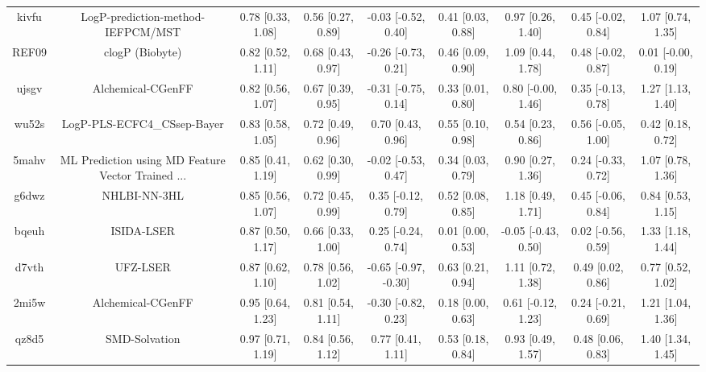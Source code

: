 \documentclass{article}
\begin{document}
\begin{center}
\begin{longtable}{|ccccccccc|}
 kivfu &                  LogP-prediction-method-IEFPCM/MST &  0.78 [0.33, 1.08] &  0.56 [0.27, 0.89] &   -0.03 [-0.52, 0.40] &  0.41 [0.03, 0.88] &    0.97 [0.26, 1.40] &   0.45 [-0.02, 0.84] &     1.07 [0.74, 1.35] \\
 REF09 &                                    clogP (Biobyte) &  0.82 [0.52, 1.11] &  0.68 [0.43, 0.97] &   -0.26 [-0.73, 0.21] &  0.46 [0.09, 0.90] &    1.09 [0.44, 1.78] &   0.48 [-0.02, 0.87] &    0.01 [-0.00, 0.19] \\
 ujsgv &                                  Alchemical-CGenFF &  0.82 [0.56, 1.07] &  0.67 [0.39, 0.95] &   -0.31 [-0.75, 0.14] &  0.33 [0.01, 0.80] &   0.80 [-0.00, 1.46] &   0.35 [-0.13, 0.78] &     1.27 [1.13, 1.40] \\
 wu52s &                        LogP-PLS-ECFC4\_CSsep-Bayer &  0.83 [0.58, 1.05] &  0.72 [0.49, 0.96] &     0.70 [0.43, 0.96] &  0.55 [0.10, 0.98] &    0.54 [0.23, 0.86] &   0.56 [-0.05, 1.00] &     0.42 [0.18, 0.72] \\
 5mahv &  ML Prediction using MD Feature Vector Trained ... &  0.85 [0.41, 1.19] &  0.62 [0.30, 0.99] &   -0.02 [-0.53, 0.47] &  0.34 [0.03, 0.79] &    0.90 [0.27, 1.36] &   0.24 [-0.33, 0.72] &     1.07 [0.78, 1.36] \\
 g6dwz &                                       NHLBI-NN-3HL &  0.85 [0.56, 1.07] &  0.72 [0.45, 0.99] &    0.35 [-0.12, 0.79] &  0.52 [0.08, 0.85] &    1.18 [0.49, 1.71] &   0.45 [-0.06, 0.84] &     0.84 [0.53, 1.15] \\
 bqeuh &                                         ISIDA-LSER &  0.87 [0.50, 1.17] &  0.66 [0.33, 1.00] &    0.25 [-0.24, 0.74] &  0.01 [0.00, 0.53] &  -0.05 [-0.43, 0.50] &   0.02 [-0.56, 0.59] &     1.33 [1.18, 1.44] \\
 d7vth &                                           UFZ-LSER &  0.87 [0.62, 1.10] &  0.78 [0.56, 1.02] &  -0.65 [-0.97, -0.30] &  0.63 [0.21, 0.94] &    1.11 [0.72, 1.38] &    0.49 [0.02, 0.86] &     0.77 [0.52, 1.02] \\
 2mi5w &                                  Alchemical-CGenFF &  0.95 [0.64, 1.23] &  0.81 [0.54, 1.11] &   -0.30 [-0.82, 0.23] &  0.18 [0.00, 0.63] &   0.61 [-0.12, 1.23] &   0.24 [-0.21, 0.69] &     1.21 [1.04, 1.36] \\
 qz8d5 &                                      SMD-Solvation &  0.97 [0.71, 1.19] &  0.84 [0.56, 1.12] &     0.77 [0.41, 1.11] &  0.53 [0.18, 0.84] &    0.93 [0.49, 1.57] &    0.48 [0.06, 0.83] &     1.40 [1.34, 1.45] \\

\end{longtable}
\end{center}
\end{document}
